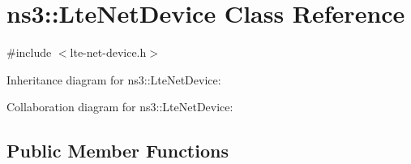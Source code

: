 \hypertarget{classns3_1_1LteNetDevice}{}\section{ns3\+:\+:Lte\+Net\+Device Class Reference}
\label{classns3_1_1LteNetDevice}


{\ttfamily \#include $<$lte-\/net-\/device.\+h$>$}



Inheritance diagram for ns3\+:\+:Lte\+Net\+Device\+:


Collaboration diagram for ns3\+:\+:Lte\+Net\+Device\+:
\subsection*{Public Member Functions}
